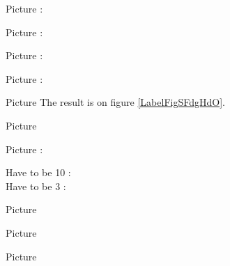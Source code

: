 Picture : 
\begin{center}
   
\end{center}

Picture : 
\begin{center}
   
\end{center}

Picture : 
\begin{center}
   
\end{center}


Picture : 
\begin{center}
   
\end{center}


Picture 
The result is on figure \ref{LabelFigSFdgHdO}. %
\newcommand{\CaptionFigSFdgHdO}{<+Type your caption here+>}


\clearpage

       Picture 
   \begin{center}

   \end{center}



\setcounter{page}{10}
\setcounter{section}{3}
Picture : 
\begin{center}
    Have to be 10 : \thepage\\
    Have to be 3 : \thesection\\
   
\end{center}




       Picture 
   \begin{center}

   \end{center}





Picture 
\newcommand{\CaptionFigOMPAooMbyOIqeA}{Marks are correct.}


\clearpage


Picture 
\begin{center}
   
\end{center}
   

